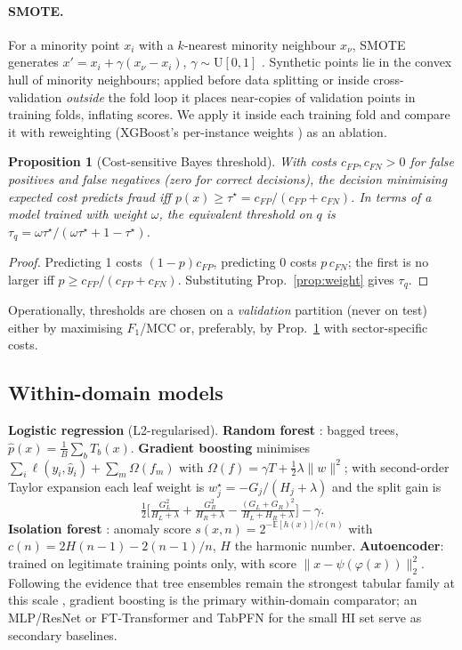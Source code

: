 \documentclass[journal]{IEEEtran}
\newtheorem{proposition}{Proposition}
\newcommand{\E}{\mathbb{E}}
\newcommand{\1}{\mathbf{1}}
\begin{document}
\paragraph{SMOTE.} For a minority point $x_i$ with a $k$-nearest minority neighbour $x_{\nu}$, SMOTE generates $x'=x_i+\gamma(x_\nu-x_i)$, $\gamma\sim\mathrm U[0,1]$ \cite{chawla2002smote}. Synthetic points lie in the convex hull of minority neighbours; applied before data splitting or inside cross-validation \emph{outside} the fold loop it places near-copies of validation points in training folds, inflating scores. We apply it inside each training fold and compare it with reweighting (XGBoost's per-instance weights \cite{chen2016xgboost}) as an ablation.

\begin{proposition}[Cost-sensitive Bayes threshold]\label{prop:cost}
With costs $c_{FP},c_{FN}>0$ for false positives and false negatives (zero for correct decisions), the decision minimising expected cost predicts fraud iff $p(x)\ge\tau^\star=c_{FP}/(c_{FP}+c_{FN})$. In terms of a model trained with weight $\omega$, the equivalent threshold on $q$ is $\tau_q=\omega\tau^\star/(\omega\tau^\star+1-\tau^\star)$.
\end{proposition}
\begin{proof}
Predicting 1 costs $(1-p)c_{FP}$, predicting 0 costs $p\,c_{FN}$; the first is no larger iff $p\ge c_{FP}/(c_{FP}+c_{FN})$. Substituting Prop.~\ref{prop:weight} gives $\tau_q$. \end{proof}
\noindent Operationally, thresholds are chosen on a \emph{validation} partition (never on test) either by maximising $F_1$/MCC or, preferably, by Prop.~\ref{prop:cost} with sector-specific costs.

\subsection{Within-domain models}
\textbf{Logistic regression} (L2-regularised). \textbf{Random forest} \cite{breiman2001rf}: bagged trees, $\hat p(x)=\frac1B\sum_b T_b(x)$. \textbf{Gradient boosting} \cite{chen2016xgboost} minimises $\sum_i\ell(y_i,\hat y_i)+\sum_m\Omega(f_m)$ with $\Omega(f)=\gamma T+\tfrac12\lambda\|w\|^2$; with second-order Taylor expansion each leaf weight is $w_j^\star=-G_j/(H_j+\lambda)$ and the split gain is
\begin{equation}
\tfrac12\Big[\tfrac{G_L^2}{H_L+\lambda}+\tfrac{G_R^2}{H_R+\lambda}-\tfrac{(G_L+G_R)^2}{H_L+H_R+\lambda}\Big]-\gamma .
\end{equation}
\textbf{Isolation forest} \cite{liu2008iforest}: anomaly score $s(x,n)=2^{-\E[h(x)]/c(n)}$ with $c(n)=2H(n-1)-2(n-1)/n$, $H$ the harmonic number. \textbf{Autoencoder}: trained on legitimate training points only, with score $\|x-\psi(\varphi(x))\|_2^2$. Following the evidence that tree ensembles remain the strongest tabular family at this scale \cite{grinsztajn2022trees,borisov2024deep}, gradient boosting is the primary within-domain comparator; an MLP/ResNet or FT-Transformer \cite{gorishniy2021revisiting} and TabPFN for the small HI set \cite{hollmann2025tabpfn} serve as secondary baselines.
\end{document}
